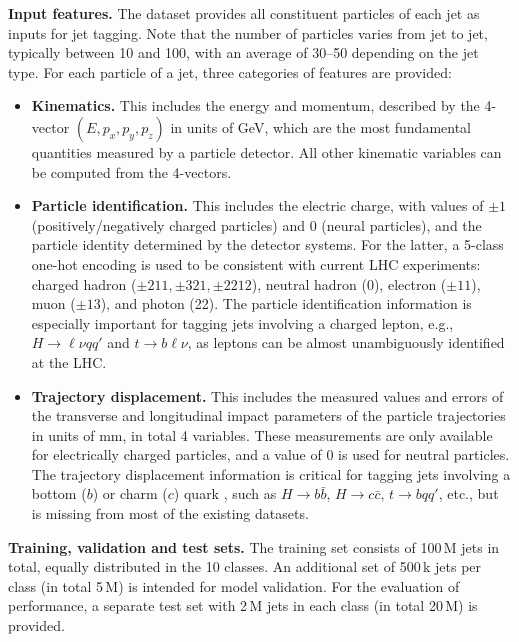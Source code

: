 \documentclass[nohyperref]{article}
\theoremstyle{plain}
\theoremstyle{definition}
\theoremstyle{remark}
\newcommand{\hbb}{\ensuremath{H\to b \bar{b}}\xspace}
\newcommand{\hcc}{\ensuremath{H\to c \bar{c}}\xspace}
\newcommand{\hlvqq}{\ensuremath{H\to \ell \nu q q'}\xspace}
\newcommand{\tbqq}{\ensuremath{t\to b q q'}\xspace}
\newcommand{\tblv}{\ensuremath{t\to b \ell \nu}\xspace}
\begin{document}
\textbf{Input features.} The dataset provides all constituent particles of each jet as inputs for jet tagging. Note that the number of particles varies from jet to jet, typically between 10 and 100, with an average of 30--50 depending on the jet type. For each particle of a jet, three categories of features are provided:
\begin{itemize}
    \vspace{-.2cm}
    \item \textbf{Kinematics.} This includes the energy and momentum, described by the 4-vector $(E, p_{x}, p_{y}, p_{z})$ in units of GeV, which are the most fundamental quantities measured by a particle detector. All other kinematic variables can be computed from the 4-vectors.
    \vspace{-.2cm}
    \item \textbf{Particle identification.} This includes the electric charge, with values of $\pm1$ (positively/negatively charged particles) and 0 (neural particles), and the particle identity determined by the detector systems. For the latter, a 5-class one-hot encoding is used to be consistent with current LHC experiments: charged hadron ($\pm211,\pm321,\pm2212$), neutral hadron (0), electron ($\pm11$), muon ($\pm13$), and photon (22). The particle identification information is especially important for tagging jets involving a charged lepton, e.g., \hlvqq and \tblv, as leptons can be almost unambiguously identified at the LHC.
    \vspace{-.2cm}
    \item \textbf{Trajectory displacement.} This includes the measured values and errors of the transverse and longitudinal impact parameters of the particle trajectories in units of mm, in total 4 variables. These measurements are only available for electrically charged particles, and a value of 0 is used for neutral particles. The trajectory displacement information is critical for tagging jets involving a bottom ($b$) or charm ($c$) quark \cite{CMS:2020poo}, such as \hbb, \hcc, \tbqq, etc., but is missing from most of the existing datasets. 
    \vspace{-.2cm}
\end{itemize}

\textbf{Training, validation and test sets.} The training set consists of 100\,M jets in total, equally distributed in the 10 classes. An additional set of 500\,k jets per class (in total 5\,M) is intended for model validation. For the evaluation of performance, a separate test set with 2\,M jets in each class (in total 20\,M) is provided. 
\end{document}
